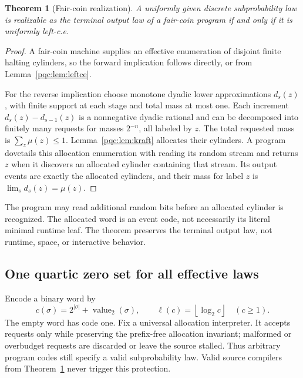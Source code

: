 \documentclass[11pt,letterpaper]{article}
\numberwithin{equation}{section}
\newtheorem{theorem}{Theorem}[section]
\theoremstyle{definition}
\theoremstyle{remark}
\newcommand{\floor}[1]{\left\lfloor #1\right\rfloor}
\begin{document}
\begin{theorem}[Fair-coin realization]\label{pqc:thm:semimeasure}
A uniformly given discrete subprobability law is realizable as the terminal
output law of a fair-coin program if and only if it is uniformly left-c.e.
\end{theorem}
\begin{proof}
A fair-coin machine supplies an effective enumeration of disjoint finite
halting cylinders, so the forward implication follows directly, or from
Lemma~\ref{pqc:lem:leftce}.

For the reverse implication choose monotone dyadic lower approximations
$d_s(z)$, with finite support at each stage and total mass at most one.
Each increment $d_s(z)-d_{s-1}(z)$ is a nonnegative dyadic rational and can
be decomposed into finitely many requests for masses $2^{-n}$, all labeled
by $z$. The total requested mass is $\sum_z\mu(z)\le1$.
Lemma~\ref{pqc:lem:kraft} allocates their cylinders. A program dovetails this
allocation enumeration with reading its random stream and returns $z$ when
it discovers an allocated cylinder containing that stream. Its output events
are exactly the allocated cylinders, and their mass for label $z$ is
$\lim_s d_s(z)=\mu(z)$.
\end{proof}

The program may read additional random bits before an allocated cylinder is
recognized. The allocated word is an event code, not necessarily its literal
minimal runtime leaf. The theorem preserves the terminal output law, not
runtime, space, or interactive behavior.

\subsection{One quartic zero set for all effective laws}
Encode a binary word by
\begin{equation}
 c(\sigma)=2^{|\sigma|}+\operatorname{value}_2(\sigma),\qquad
 \ell(c)=\floor{\log_2 c}\quad(c\ge1).
\end{equation}
The empty word has code one. Fix a universal allocation interpreter. It
accepts requests only while preserving the prefix-free allocation invariant;
malformed or overbudget requests are discarded or leave the source stalled.
Thus arbitrary program codes still specify a valid subprobability law.
Valid source compilers from Theorem~\ref{pqc:thm:semimeasure} never trigger this
protection.
\end{document}
